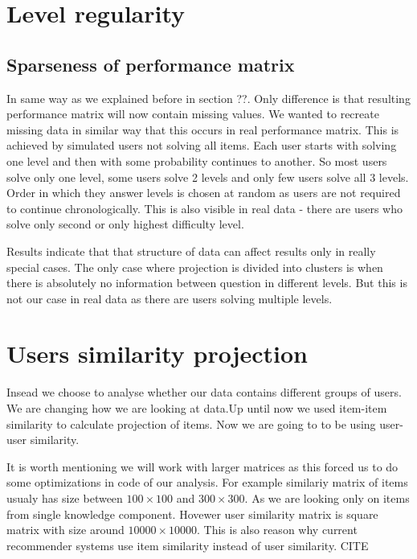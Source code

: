 \documentclass[
  digital, %
  table,   %
  nolof,     %
  nolot,     %
  nocover
]{fithesis3}
\begin{document}
\section{Level regularity}\label{level-regularity}

\subsection{Sparseness of performance
matrix}\label{sparseness-of-performance-matrix}



In same way as we explained before in section ??. Only difference is that resulting performance matrix will now contain missing values. We wanted to recreate missing data in similar way that this occurs in real performance matrix. This is achieved by simulated users not solving all items. Each user starts with solving one level and then with some probability continues to another. So most users solve only one level, some users solve 2 levels and only few users solve all 3 levels. Order in which they answer levels is chosen at random as users are not required to continue chronologically. This is also visible in real data - there are users who solve only second or only highest difficulty level.

Results indicate that that structure of data can affect results only in really special cases. The only case where projection is divided into clusters is when there is absolutely no information between question in different levels. But this is not our case in real data as there are users solving multiple levels.


\section{Users similarity
projection}\label{users-similarity-projection}

Insead we choose to analyse whether our data contains different groups
of users. We are changing how we are looking at data.Up until now we
used item-item similarity to calculate projection of items. Now we are
going to to be using user-user similarity.

It is worth mentioning we will work with larger matrices as this forced
us to do some optimizations in code of our analysis. For example
similariy matrix of items usualy has size between $100\times 100$ and
$300\times 300$. As we are looking only on items from single knowledge
component. Hovewer user similarity matrix is square matrix with size
around $10 000\times 10 000$. This is also reason why current
recommender systems use item similarity instead of user similarity. CITE
\end{document}
